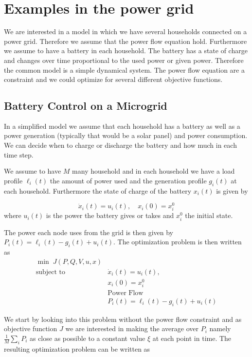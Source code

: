\section{Examples in the power grid}

We are interested in a model in which we have several households connected on a power grid. Therefore we assume that the power flow equation hold. Furthermore we assume to have a battery in each household. The battery has a state of charge and changes over time proportional to the used power or given power. Therefore the common model is a simple dynamical system. The power flow equation are a constraint and we could optimize for several different objective functions.


\subsection{Battery Control on a Microgrid}


In a simplified model we assume that each household has a battery as well as a power generation (typically that would be a solar panel) and power consumption. We can decide when to charge or discharge the battery and how much in each time step. 

We assume to have $M$ many household and in each household we have a load profile $\ell_i(t)$ the amount of power used and the generation profile $g_i(t)$ at each household. Furthermore the state of charge of the battery  $x_i(t)$ is given by

\[\dot{x}_i(t)=u_i(t), \quad x_i(0)=x_i^0\]
where $u_i(t)$ is the power the battery gives or takes and $x_i^0$ the initial state.

The power each node uses from the grid is then given by $P_i(t)=\ell_i(t)-g_i(t)+u_i(t)$.
The optimization problem is then written as
\begin{subequations}
\begin{align}
\min \;J(P,Q,V,u,x)\\
\mbox{subject to } &\dot{x}_i(t)=u_i(t), \\ 
&x_i(0)=x_i^0\\
&\mbox{Power Flow}\\
&P_i(t)=\ell_i(t)-g_i(t)+u_i(t)
\end{align}
\label{batterycontrol}
\end{subequations}

We start by looking into this problem without the power flow constraint and as objective function $J$ we are interested in making the average over $P_i$ namely $\frac{1}{M}\sum_i P_i$ as close as possible to a constant value $\xi$ at each point in time. The resulting optimization problem can be written as

